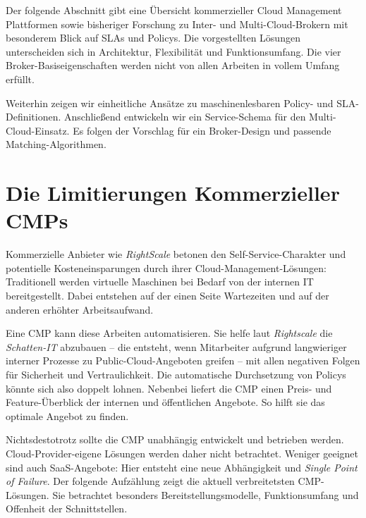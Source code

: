 \noindent
Der folgende Abschnitt gibt eine Übersicht kommerzieller Cloud Management Plattformen sowie bisheriger Forschung zu Inter- und Multi-Cloud-Brokern mit besonderem Blick auf SLAs und Policys. Die vorgestellten Lösungen unterscheiden sich in Architektur, Flexibilität und Funktionsumfang. Die vier Broker-Basiseigenschaften werden nicht von allen Arbeiten in vollem Umfang erfüllt.

Weiterhin zeigen wir einheitliche Ansätze zu maschinenlesbaren Policy- und SLA-Definitionen. Anschließend entwickeln wir ein Service-Schema für den Multi-Cloud-Einsatz. Es folgen der Vorschlag für ein Broker-Design und passende Matching-Algorithmen.

\section{Die Limitierungen Kommerzieller CMPs}

Kommerzielle Anbieter wie \emph{RightScale} betonen den Self-Service-Charakter und potentielle Kosteneinsparungen durch ihrer Cloud-Management-Lösungen: Traditionell werden virtuelle Maschinen bei Bedarf von der internen IT bereitgestellt. Dabei entstehen auf der einen Seite Wartezeiten und auf der anderen erhöhter Arbeitsaufwand. 

Eine CMP kann diese Arbeiten automatisieren. Sie helfe laut \emph{Rightscale} die \emph{Schatten-IT} abzubauen -- die entsteht, wenn Mitarbeiter aufgrund langwieriger interner Prozesse zu Public-Cloud-Angeboten greifen -- mit allen negativen Folgen für Sicherheit und Vertraulichkeit. Die automatische Durchsetzung von Policys könnte sich also doppelt lohnen. Nebenbei liefert die CMP einen Preis- und Feature-Überblick der internen und öffentlichen Angebote. So hilft sie das optimale Angebot zu finden.

Nichtsdestotrotz sollte die CMP unabhängig entwickelt und betrieben werden. Cloud-Provider-eigene Lösungen werden daher nicht betrachtet. Weniger geeignet sind auch SaaS-Angebote: Hier entsteht eine neue Abhängigkeit und \emph{Single Point of Failure}. Der folgende Aufzählung zeigt die aktuell verbreitetsten CMP-Lösungen. Sie betrachtet besonders Bereitstellungsmodelle, Funktionsumfang und Offenheit der Schnittstellen.



